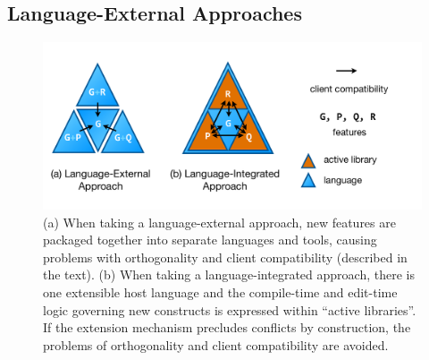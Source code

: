 \subsection{Language-External Approaches}\label{external-approaches}
\begin{figure}
\begin{center}
\includegraphics[scale=.48]{approaches.pdf}
\end{center}
\vspace{-20px}
\caption{\small (a) When taking a language-external approach, new features are packaged together into separate languages and tools, causing problems with orthogonality and client compatibility (described in the text). (b) When taking a language-integrated approach, there is one extensible host language and the compile-time and edit-time logic governing new constructs is expressed within ``active libraries''. If the extension mechanism precludes conflicts by construction, the problems of orthogonality and client compatibility are avoided.}
\label{approaches}
\end{figure}

